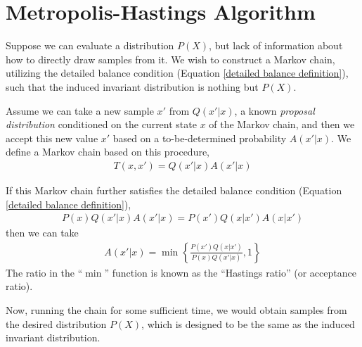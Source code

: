 \documentclass{book}
\begin{document}

\section{Metropolis-Hastings Algorithm}
Suppose we can evaluate a distribution $P(X)$, but lack of information about how to directly draw samples from it. We wish to construct a Markov chain, utilizing the detailed balance condition (Equation \ref{detailed balance definition}), such that the induced invariant distribution is nothing but $P(X)$.

Assume we can take a new sample $x'$ from $Q(x'|x)$, a known {\em{proposal distribution}} conditioned on the current state $x$ of the Markov chain, and then we accept this new value $x'$ based on a to-be-determined probability $A(x'|x)$. We define a Markov chain based on this procedure,
\begin{align}
	T(x,x') = Q(x'|x)A(x'|x)
\end{align}

If this Markov chain further satisfies the detailed balance condition (Equation \ref{detailed balance definition}),
\begin{align}
	P(x)Q(x'|x)A(x'|x) = P(x')Q(x|x')A(x|x') \label{detailed balance equation}
\end{align}
then we can take
\begin{align}
	A(x'|x) = \min \left\{ \frac{P(x')Q(x|x')}{P(x)Q(x'|x)}, 1 \right\} \label{hastings ratio}
\end{align}
The ratio in the ``$\min$'' function is known as the ``Hastings ratio'' (or acceptance ratio).

Now, running the chain for some sufficient time, we would obtain samples from the desired distribution $P(X)$, which is designed to be the same as the induced invariant distribution.

\end{document}

